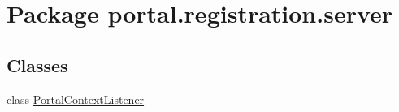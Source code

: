 \hypertarget{namespaceportal_1_1registration_1_1server}{
\section{Package portal.registration.server}
\label{namespaceportal_1_1registration_1_1server}
}
\subsection*{Classes}
\begin{DoxyCompactItemize}
\item 
class \hyperlink{classportal_1_1registration_1_1server_1_1PortalContextListener}{PortalContextListener}
\end{DoxyCompactItemize}
